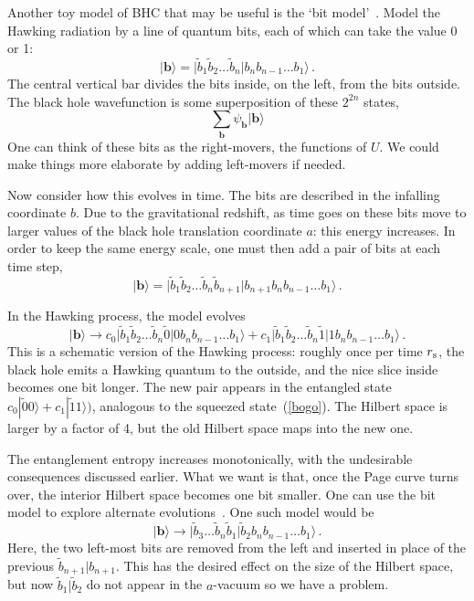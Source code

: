 \documentclass[12pt]{article}
\newcommand{\be}{\begin{equation}}
\newcommand{\ee}{\end{equation}}
\newcommand{\rmx}{\rm}
\newcommand{\rs}{r_{\rmx s}}
\begin{document}
Another toy model of BHC that may be useful is the `bit model'~\cite{Mathur:2009hf,Giddings:2011ks}.
Model the Hawking radiation by a line of quantum bits, each of which can take the value 0 or 1:
\be
| {\pmb b} \rangle = |\tilde b_{1} \tilde b_{2} \ldots \tilde b_{n} | b_n  b_{n-1} \ldots b_1\rangle \,. \label{2nb}
\ee
The central vertical bar divides the bits inside, on the left, from the bits outside. The black hole wavefunction is some superposition of these $2^{2n}$ states,
\be
\sum_{\pmb b} \psi_{\pmb b} | {\pmb b} \rangle 
\ee
One can think of these bits as the right-movers, the functions of $U$.  We could make things more elaborate by adding left-movers if needed.

Now consider how this evolves in time.  The bits are described in the infalling coordinate $b$.   Due to the gravitational redshift, as time goes on these bits move to larger values of the black hole translation coordinate $a$: this energy increases.  In order to keep the same energy scale, one must then add a pair of bits at each time step,
\be
| {\pmb b} \rangle = |\tilde b_{1} \tilde b_{2} \ldots \tilde b_{n}\tilde b_{n+1} | b_{n+1}   b_n  b_{n-1} \ldots b_1\rangle \,. 
\ee

In the Hawking process, the model evolves
\be
| {\pmb b} \rangle \to c_0 |\tilde b_{1} \tilde b_{2} \ldots \tilde b_{n} \tilde 0 | 0 b_n  b_{n-1} \ldots b_1\rangle +  c_1|\tilde b_{1} \tilde b_{2} \ldots \tilde b_{n} \tilde 1 | 1 b_n  b_{n-1} \ldots b_1\rangle \,. \label{bmhawk}
\ee
This is a schematic version of the Hawking process: roughly once per time $\rs$, the black hole emits a Hawking quantum to the outside, and the nice slice inside becomes one bit longer.  The new pair appears in the entangled state $c_0 |\tilde 00\rangle + c_1 |\tilde 11\rangle)$, analogous to the squeezed state~(\ref{bogo}).  The Hilbert space is larger by a factor of 4, but the old Hilbert space maps into the new one.

The entanglement entropy increases monotonically, with the undesirable consequences discussed earlier.  What we want is that, once the Page curve turns over, the interior Hilbert space becomes one bit smaller.  One can use the bit model to explore alternate evolutions~\cite{Mathur:2009hf,Giddings:2011ks}.
One such model would be
\be
| {\pmb b} \rangle \to | \tilde b_3 \ldots \tilde b_{n} \tilde b_1 | \tilde b_2 b_n  b_{n-1} \ldots b_1\rangle  \,.  \label{bmunit}
\ee
Here, the two left-most  bits are removed from the left and inserted in place of the previous 
$\tilde b_{n+1} | b_{n+1}$.  This has the desired effect on the size of the Hilbert space, but now $\tilde b_1|   
\tilde b_2$ do not appear in the $a$-vacuum so we have a problem.
\end{document}
